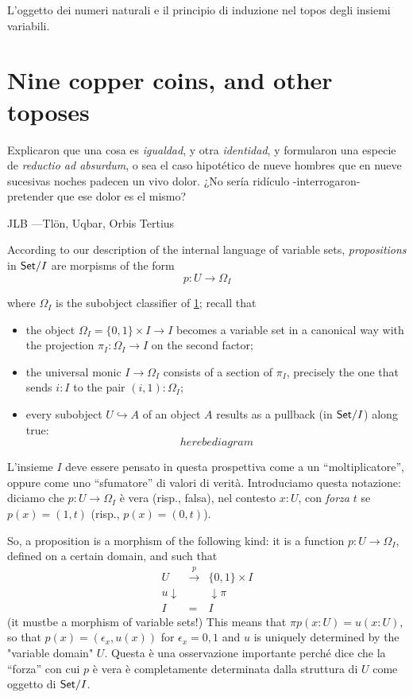 \documentclass{amsart}
\begin{document}
L'oggetto dei numeri naturali e il principio di induzione nel topos degli insiemi variabili.
\section{Nine copper coins, and other toposes}
\epigraph{Explicaron que una cosa es \emph{igualdad}, y otra \emph{identidad}, y formularon una especie de \emph{reductio ad absurdum}, o sea el caso hipotético de nueve hombres que en nueve sucesivas noches padecen un vivo dolor. ¿No sería ridículo -interrogaron- pretender que ese dolor es el mismo?}{JLB ---Tl\"on, Uqbar, Orbis Tertius}
According to our description of the internal language of variable sets, \emph{propositions} in $\mathsf{Set}/I$ are morpisms of the form
\[p : U \to \Omega_I\]

where $\Omega_I$ is the subobject classifier of \ref{}; recall that
\begin{itemize}
  \item the object $\Omega_I = \{0,1\}\times I \to I$ becomes a variable set in a canonical way with the projection $\pi_I : \Omega_I \to I$ on the second factor;
  \item the universal monic $I \to \Omega_I$ consists of a section of $\pi_I$, precisely the one that sends $i : I$ to the pair $(i,1) : \Omega_I$;
  \item every subobject $U \hookrightarrow A$ of an object $A$ results as a pullback (in $\mathsf{Set}/I$) along true:
        \[here be diagram\]
\end{itemize}
L'insieme $I$ deve essere pensato in questa prospettiva come a un ``moltiplicatore'', oppure come uno ``sfumatore'' di valori di verità. Introduciamo questa notazione: diciamo che $p : U \to \Omega_I$ è vera (risp., falsa), nel contesto $x :U$, con \emph{forza} $t$ se $p(x) =(1,t)$ (risp., $p(x)=(0,t)$).

So, a proposition is a morphism of the following kind: it is a function $p : U \to \Omega_I$, defined on a certain domain, and such that
$$
  \begin{array}{ccc}
    U           & \overset{p}\to & \{0,1\}\times I \\
    u\downarrow &                & \downarrow\pi   \\
    I           & =              & I
  \end{array}
$$
(it mustbe a morphism of variable sets!) This means that $\pi p(x : U) = u(x : U)$, so that $p(x) = (\epsilon_x, u(x))$ for $\epsilon_x =0,1$ and $u$ is uniquely determined by the "variable domain" $U$. Questa è una osservazione importante perché dice che la ``forza'' con cui $p$ è vera è completamente determinata dalla struttura di $U$ come oggetto di $\mathsf{Set}/I$.
\end{document}
